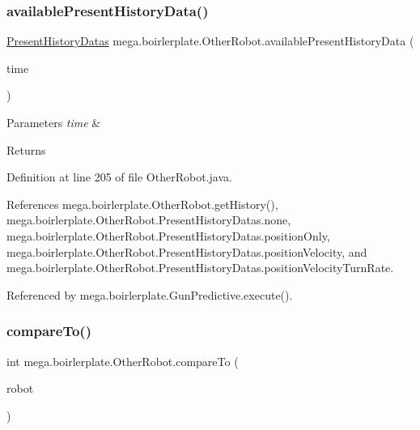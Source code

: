 \subsubsection{\texorpdfstring{available\+Present\+History\+Data()}{availablePresentHistoryData()}}
{\footnotesize\ttfamily \hyperlink{enummega_1_1boirlerplate_1_1_other_robot_1_1_present_history_datas}{Present\+History\+Datas} mega.\+boirlerplate.\+Other\+Robot.\+available\+Present\+History\+Data (\begin{DoxyParamCaption}\item[{long}]{time }\end{DoxyParamCaption})}


\begin{DoxyParams}{Parameters}
{\em time} & \\
\hline
\end{DoxyParams}
\begin{DoxyReturn}{Returns}

\end{DoxyReturn}


Definition at line 205 of file Other\+Robot.\+java.



References mega.\+boirlerplate.\+Other\+Robot.\+get\+History(), mega.\+boirlerplate.\+Other\+Robot.\+Present\+History\+Datas.\+none, mega.\+boirlerplate.\+Other\+Robot.\+Present\+History\+Datas.\+position\+Only, mega.\+boirlerplate.\+Other\+Robot.\+Present\+History\+Datas.\+position\+Velocity, and mega.\+boirlerplate.\+Other\+Robot.\+Present\+History\+Datas.\+position\+Velocity\+Turn\+Rate.



Referenced by mega.\+boirlerplate.\+Gun\+Predictive.\+execute().

\mbox{\label{classmega_1_1boirlerplate_1_1_other_robot_a8cdfdab759605fde60c407fb831e00ef}} 
\subsubsection{\texorpdfstring{compare\+To()}{compareTo()}}
{\footnotesize\ttfamily int mega.\+boirlerplate.\+Other\+Robot.\+compare\+To (\begin{DoxyParamCaption}\item[{\hyperlink{classmega_1_1boirlerplate_1_1_other_robot}{Other\+Robot}}]{robot }\end{DoxyParamCaption})}



